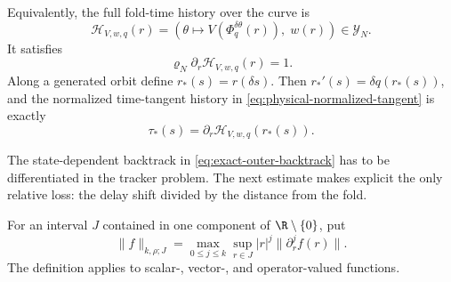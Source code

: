 \begin{proposition}
Equivalently, the full fold-time history over the curve is
\begin{equation}
 \mathcal H_{V,w,q}(r)
 =\left(
   \theta\longmapsto V(\Phi_q^{\delta\theta}(r)),
   \;w(r)\right)\in\mathscr Y_N.                    \label{eq:exact-outer-history-embedding}
\end{equation}
It satisfies
\begin{equation}
 \varrho_N\partial_r\mathcal H_{V,w,q}(r)=1.        \label{eq:exact-outer-history-phase}
\end{equation}
Along a generated orbit define \(r_*(s)=r(\delta s)\).  Then
\(r_*'(s)=\delta q(r_*(s))\), and the normalized
time-tangent history in
\cref{eq:physical-normalized-tangent} is exactly
\begin{equation}
 \tau_*(s)=
 \partial_r\mathcal H_{V,w,q}(r_*(s)).              \label{eq:exact-outer-history-tangent}
\end{equation}
\end{proposition}

The state-dependent backtrack in
\cref{eq:exact-outer-backtrack} has to be differentiated in the tracker
problem.  The next estimate makes explicit the only relative loss: the delay
shift divided by the distance from the fold.

For an interval \(J\) contained in one component of \(\R\setminus\{0\}\),
put
\begin{equation}
 \|f\|_{k,\rho;J}
 =\max_{0\le j\le k}\sup_{r\in J}
       |r|^j\|\partial_r^jf(r)\|.                  \label{eq:backtrack-weighted-norm}
\end{equation}
The definition applies to scalar-, vector-, and operator-valued functions.

